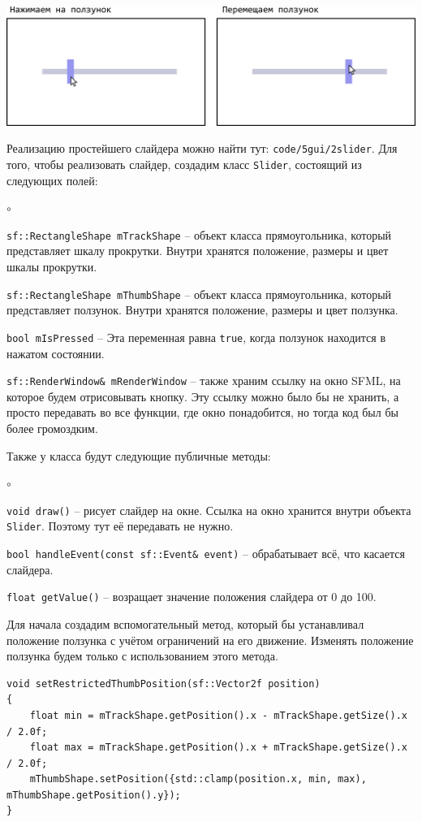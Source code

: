 \documentclass{article}
\begin{document}
\begin{center}
\includegraphics[scale=0.9]{../images/slider.png}
\end{center}
Реализацию простейшего слайдера можно найти тут: \texttt{code/5gui/2slider}.
Для того, чтобы реализовать слайдер, создадим класс \texttt{Slider}, состоящий из следующих полей:
\begin{list}{$\circ$}{}  
\item \texttt{sf::RectangleShape mTrackShape} -- объект класса прямоугольника, который представляет шкалу прокрутки. Внутри хранятся положение, размеры и цвет шкалы прокрутки.
\item \texttt{sf::RectangleShape mThumbShape} -- объект класса прямоугольника, который представляет ползунок. Внутри хранятся положение, размеры и цвет ползунка.
\item \texttt{bool mIsPressed} -- Эта переменная равна \texttt{true}, когда ползунок находится в нажатом состоянии.
\item \texttt{sf::RenderWindow\& mRenderWindow} -- также храним ссылку на окно SFML, на которое будем отрисовывать кнопку. Эту ссылку можно было бы не хранить, а просто передавать во все функции, где окно понадобится, но тогда код был бы более громоздким.
\end{list}
Также у класса будут следующие публичные методы:
\begin{list}{$\circ$}{}  
\item \texttt{void draw()} -- рисует слайдер на окне. Ссылка на окно хранится внутри объекта \texttt{Slider}. Поэтому тут её передавать не нужно.
\item \texttt{bool handleEvent(const sf::Event\& event)} -- обрабатывает всё, что касается слайдера.
\item \texttt{float getValue()} -- возращает значение положения слайдера от 0 до 100.
\end{list}
Для начала создадим вспомогательный метод, который бы устанавливал положение ползунка с учётом ограничений на его движение. Изменять положение ползунка будем только с использованием этого метода.
\begin{lstlisting}[frame=none]
void setRestrictedThumbPosition(sf::Vector2f position)
{
    float min = mTrackShape.getPosition().x - mTrackShape.getSize().x / 2.0f;
    float max = mTrackShape.getPosition().x + mTrackShape.getSize().x / 2.0f;
    mThumbShape.setPosition({std::clamp(position.x, min, max), mThumbShape.getPosition().y});
}
\end{lstlisting}
\end{document}
